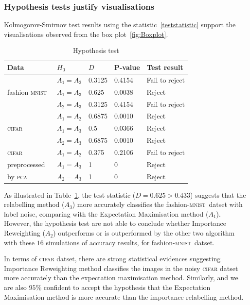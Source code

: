 \documentclass[12pt]{article} %
\newcommand{\mnist}{fashion-\textsc{mnist}\ }
\begin{document}
\subsubsection{Hypothesis tests justify visualisations}
Kolmogorov-Smirnov test results using the statistic~\eqref{teststatistic} support the visualisations observed from the box plot~\ref{fig:Boxplot}.
\begin{table}%
\centering
 	\caption{Hypothesis test}
	\begin{tabular}{lllll}
\toprule
Data & $H_0$ & $D$ & P-value & Test result\\
\midrule
 & $A_1= A_2$  &0.3125 & 0.4154 & Fail to reject\\

\mnist & $A_1= A_3$ & 0.625 & 0.0038 & Reject\\

  & $A_2= A_3$ & 0.3125 & 0.4154 & Fail to reject\\
\midrule
   & $A_1= A_2$ & 0.6875 & 0.0010 & Reject\\

 \textsc{cifar}  & $A_1= A_3$ & 0.5 & 0.0366 & Reject\\

  &  $A_2=A_3$  & 0.6875 & 0.0010 & Reject\\
 \midrule
  \textsc{cifar} & $A_1= A_2$ & 0.375 & 0.2106 & Fail to reject\\

  preprocessed & $A_1= A_3$ & 1 & 0 & Reject\\

  by \textsc{pca} &  $A_2=A_3$  & 1 & 0 & Reject\\
\bottomrule
\end{tabular}

	\label{tab:HypothesisTest}
\end{table}
As illustrated in  Table~\ref{tab:HypothesisTest}, the test statistic ($D=0.625>0.433$) suggests that the relabelling method ($A_3$) more accurately classifies the \mnist datset with label noise, comparing with the Expectation Maximisation method ($A_1$).
However, the hypothesis test are not able to conclude whether Importance Reweighting ($A_2$) outperforms or is outperformed by the other two algorithm with these $16$ simulations of accuracy results, for \mnist datset.

In terms of \textsc{cifar} datset, there are strong statistical evidences suggesting Importance Reweighting method classifies the images in the noisy \textsc{cifar} datset more accurately than the expectation maximisation method. Similarly, and we are also $95\%$ confident to accept the hypothesis that the Expectation Maximisation method is more accurate than the importance relabelling method.
\end{document}
